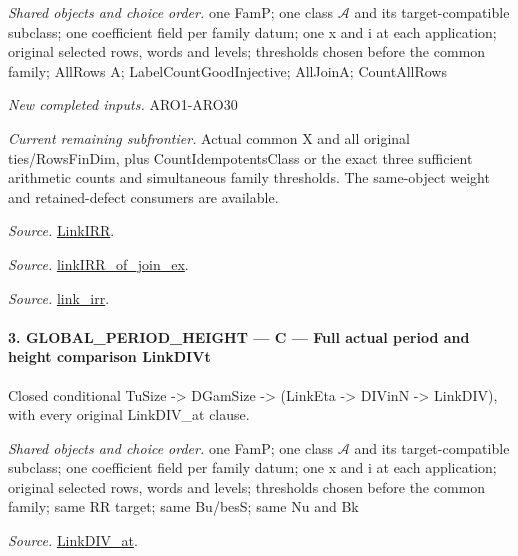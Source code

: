 \emph{Shared objects and choice order.} one FamP; one class $\mathcal A$ and its target-compatible subclass; one coefficient field per family datum; one x and i at each application; original selected rows, words and levels; thresholds chosen before the common family; AllRows A; LabelCountGoodInjective; AllJoinA; CountAllRows

\emph{New completed inputs.} ARO1-ARO30

\emph{Current remaining subfrontier.} Actual common X and all original ties/RowsFinDim, plus CountIdempotentsClass or the exact three sufficient arithmetic counts and simultaneous family thresholds. The same-object weight and retained-defect consumers are available.

\emph{Source.} \href{https://github.com/CocoSgt/riemann-hypothesis-lean/blob/7cbf7a0c32fca1badf05931879a37c3f8a2b03b4/src/Formalism/SharpRestriction/GlobalTheoremInputs.lean#L55-L58}{LinkIRR}.

\emph{Source.} \href{https://github.com/CocoSgt/riemann-hypothesis-lean/blob/7cbf7a0c32fca1badf05931879a37c3f8a2b03b4/src/Development/AbelianVarietyTheory/Proofs/GlobalInterpolation/LinkIRROfJoinEx.lean#L17-L38}{linkIRR\_\allowbreak of\_\allowbreak join\_\allowbreak ex}.

\emph{Source.} \href{https://github.com/CocoSgt/riemann-hypothesis-lean/blob/7cbf7a0c32fca1badf05931879a37c3f8a2b03b4/src/Development/AbelianVarietyTheory/Proofs/GlobalInterpolation/LinkIRROfJoinEx.lean#L143-L166}{link\_\allowbreak irr}.



\paragraph{3. GLOBAL\_\allowbreak PERIOD\_\allowbreak HEIGHT — C — Full actual period and height comparison LinkDIVt}

Closed conditional TuSize -> DGamSize -> (LinkEta -> DIVinN -> LinkDIV), with every original LinkDIV\_\allowbreak at clause.

\emph{Shared objects and choice order.} one FamP; one class $\mathcal A$ and its target-compatible subclass; one coefficient field per family datum; one x and i at each application; original selected rows, words and levels; thresholds chosen before the common family; same RR target; same Bu/besS; same Nu and Bk

\emph{Source.} \href{https://github.com/CocoSgt/riemann-hypothesis-lean/blob/7cbf7a0c32fca1badf05931879a37c3f8a2b03b4/src/Formalism/SharpRestriction/GlobalTheoremInputs.lean#L77-L90}{LinkDIV\_\allowbreak at}.

